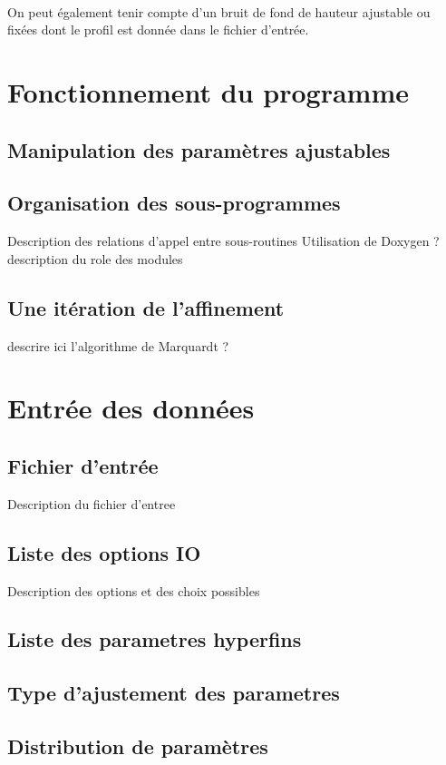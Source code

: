 \documentclass[a4paper]{article}
\begin{document}
\paragraph{}
On peut également tenir compte d'un bruit de fond de hauteur ajustable ou fixées dont le profil est donnée dans le fichier d'entrée.
\newpage
\tableofcontents
\newpage
\section{Fonctionnement du programme}

\subsection{Manipulation des paramètres ajustables}
\subsection{Organisation des sous-programmes}
Description des relations d'appel entre sous-routines 
Utilisation de Doxygen ?
description du role des modules

\subsection{Une itération de l'affinement}
descrire ici l'algorithme de Marquardt ?
\section{Entrée des données}
\subsection{Fichier d'entrée}
Description du fichier d'entree
\subsection{Liste des options IO}
Description des options et des choix possibles
\subsection{Liste des parametres hyperfins}
\subsection{Type d'ajustement des parametres}
\subsection{Distribution de paramètres}
\end{document}
